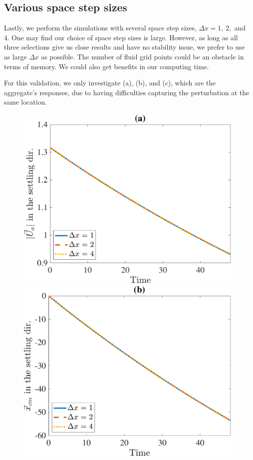\subsection{Various space step sizes}
Lastly, we perform the simulations with several space step sizes, $\Delta x = 1, \ 2, $ and $4$. One may find our choice of space step sizes is large. However, as long as all three selections give us close results and have no stability issue, we prefer to use as large $\Delta x$ as possible. 
The number of fluid grid points could be an obstacle in terms of memory. We could also get benefits in our computing time. 
\par
For this validation, we only investigate  (a), (b), and (c), which are the aggregate's responses, due to having difficulties capturing the perturbation at the same location. 
\begin{figure}[ht]
	\begin{center}
		\includegraphics[scale=0.25]{./figures/fig_NC10_dx_Ua3_all}
		\includegraphics[scale=0.25]{./figures/fig_NC10_dx_cm3_all}

\end{center}
\end{figure}

